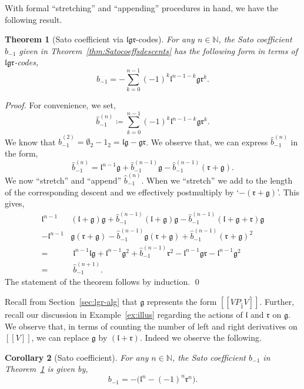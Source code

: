 \documentclass[5p,twocolumn]{elsarticle}
\newcommand*{\lb}{[\![}
\newcommand*{\rb}{]\!]}
\newcommand*{\el}{\mathfrak l}
\newcommand*{\gl}{\mathfrak g}
\newcommand*{\rl}{\mathfrak r}
\newtheorem{theorem}{Theorem}
\newtheorem{corollary}[theorem]{Corollary}
\begin{document}
%
With formal ``stretching'' and ``appending'' procedures in hand, we have the following result.
%
\begin{theorem}[Sato coefficient via $\el\gl\rl$-codes]\label{thm:Satocoeffsvialgr}
  For any $n\in\mathbb N$, the Sato coefficient $b_{-1}$ given in Theorem~\ref{thm:Satocoeffsdescents}
  has the following form in terms of $\el\gl\rl$-codes,
  \begin{equation}\label{eq:Satocoeffsvialgr}
    b_{-1}=-\sum_{k=0}^{n-1}(-1)^k\el^{n-1-k}\gl\rl^k.
  \end{equation}
\end{theorem}
%
\begin{proof}
  For convenience, we set,
  \begin{equation*}
    \hat{b}_{-1}^{(n)}\coloneqq \sum_{k=0}^{n-1}(-1)^k\el^{n-1-k}\gl\rl^k.
  \end{equation*}
  We know that $\hat{b}_{-1}^{(2)}=\emptyset_2-1_2=\el\gl-\gl\rl$.
  We observe that, we can express $\hat{b}_{-1}^{(n)}$ in the form,
  \begin{equation*}
   \hat{b}_{-1}^{(n)}=\el^{n-1}\gl+\hat{b}_{-1}^{(n-1)}\gl-\hat{b}_{-1}^{(n-1)}(\rl+\gl).
  \end{equation*}
  We now ``stretch'' and ``append'' $\hat{b}_{-1}^{(n)}$. When we ``stretch'' we add to the length of the corresponding descent and we effectively postmultiply by `$-(\rl+\gl)$'.
  This gives,
  \begin{align*}
     \el^{n-1}&(\el+\gl)\gl+\hat{b}_{-1}^{(n-1)}(\el+\gl)\gl-\hat{b}_{-1}^{(n-1)}(\el+\gl+\rl)\gl\\
    -\el^{n-1}&\gl(\rl+\gl)-\hat{b}_{-1}^{(n-1)}\gl(\rl+\gl)+\hat{b}_{-1}^{(n-1)}(\rl+\gl)^2\\
    =&\;\el^{n-1}\el\gl+\el^{n-1}\gl^2+\hat{b}_{-1}^{(n-1)}\rl^2-\el^{n-1}\gl\rl-\el^{n-1}\gl^2\\
    =&\;\hat{b}_{-1}^{(n+1)}.
  \end{align*}
  The statement of the theorem follows by induction.
\qed
\end{proof}
%
Recall from Section~\ref{sec:lgr-alg} that $\gl$ represents the form $\lb VP_{\hat{1}}V\rb$. 
Further, recall our discussion in Example~\ref{ex:illus} regarding the actions of $\el$ and $\rl$ on $\gl$.
We observe that, in terms of counting the number of left and right derivatives on $\lb V\rb$, we can replace $\gl$ by $(\el+\rl)$.
Indeed we observe the following.
%
\begin{corollary}[Sato coefficient]\label{cor:Satocoeff}
 For any $n\in\mathbb N$, the Sato coefficient $b_{-1}$ in Theorem~\ref{thm:Satocoeffsvialgr} is given by,
  \begin{equation*}
    b_{-1}=-\bigl(\el^n-(-1)^n\rl^n\bigr).
  \end{equation*} 
\end{corollary}
\end{document}
